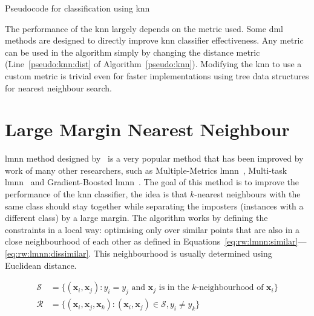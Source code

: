 \begin{algorithm}[t]
\caption{Pseudocode for classification using \ac{knn}} \label{pseudo:knn}
\DontPrintSemicolon
\LinesNumbered
{}
\end{algorithm} 

The performance of the \ac{knn} largely depends on the metric used. Some \ac{dml} methods are designed to directly improve \ac{knn} classifier effectiveness. Any metric can be used in the algorithm simply by changing the distance metric (Line~\ref{pseudo:knn:dist} of Algorithm~\ref{pseudo:knn}). Modifying the \ac{knn} to use a custom metric is trivial even for faster implementations using tree data structures for nearest neighbour search.

\section{Large Margin Nearest Neighbour} \label{chap:rw:lmnn}

\Acf{lmnn} method designed by~\citep{weinberger2009distance} is a very popular method that has been improved by work of many other researchers, such as Multiple-Metrics \ac{lmnn}~\citep{weinberger2008fast}, Multi-task \ac{lmnn}~\citep{parameswaran2010large} and Gradient-Boosted \ac{lmnn}~\citep{kedem2012non}. The goal of this method is to improve the performance of the \ac{knn} classifier, the idea is that $k$-nearest neighbours with the same class should stay together while separating the imposters (instances with a different class) by a large margin. The algorithm works by defining the constraints in a local way: optimising only over similar points that are also in a close neighbourhood of each other as defined in Equations~\ref{eq:rw:lmnn:similar}---\ref{eq:rw:lmnn:dissimilar}. This neighbourhood is usually determined using Euclidean distance.

\begin{align}
\mathcal{S} &= \lbrace(\bm{x}_i,\bm{x}_j): y_i = y_j \text{ and } \bm{x}_j \text{ is in the }k\text{-neighbourhood of } \bm{x}_i \rbrace \label{eq:rw:lmnn:similar} \\
\mathcal{R} &= \lbrace(\bm{x}_i,\bm{x}_j,\bm{x}_k): (\bm{x}_i,\bm{x}_j) \in \mathcal{S}, y_i \neq y_k \rbrace \label{eq:rw:lmnn:dissimilar}
\end{align}

